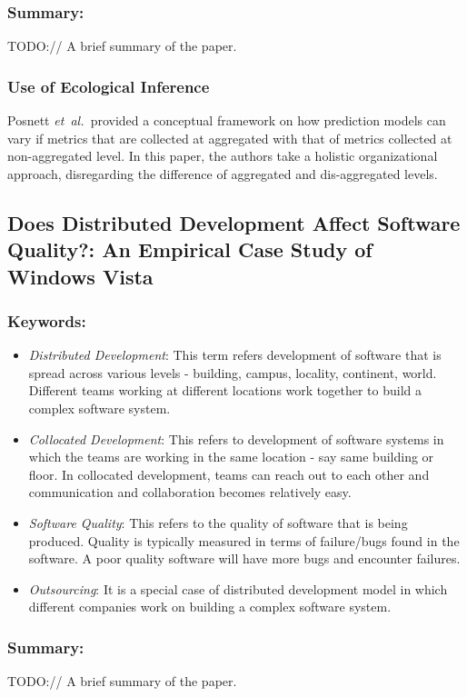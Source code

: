 \documentclass{sig-alternate-05-2015}
\newcommand{\etal}{\mbox{\emph{et al.\ }}}
\begin{document}
\subsubsection{Summary:}
TODO:// A brief summary of the paper.

\subsubsection{Use of Ecological Inference}
Posnett \etal provided a conceptual framework on how prediction models can vary if metrics that are collected at aggregated with that of metrics collected at non-aggregated level. In this paper, the authors take a holistic organizational approach, disregarding the difference of aggregated and dis-aggregated levels.

\subsection{Does Distributed Development Affect Software Quality?: An Empirical Case Study of Windows Vista \cite{Bird:2009}}

\subsubsection{Keywords:}
\begin{itemize}
\item \emph{Distributed Development}: This term refers development of software that is spread across various levels - building, campus, locality, continent, world. Different teams working at different locations work together to build a complex software system.
\item \emph{Collocated Development}: This refers to development of software systems in which the teams are working in the same location - say same building or floor. In collocated development, teams can reach out to each other and communication and collaboration becomes relatively easy.
\item \emph{Software Quality}: This refers to the quality of software that is being produced. Quality is typically measured in terms of failure/bugs found in the software. A poor quality software will have more bugs and encounter failures.
\item \emph{Outsourcing}: It is a special case of distributed development model in which different companies work on building a complex software system.
\end{itemize} 

\subsubsection{Summary:}
TODO:// A brief summary of the paper.
\end{document}
